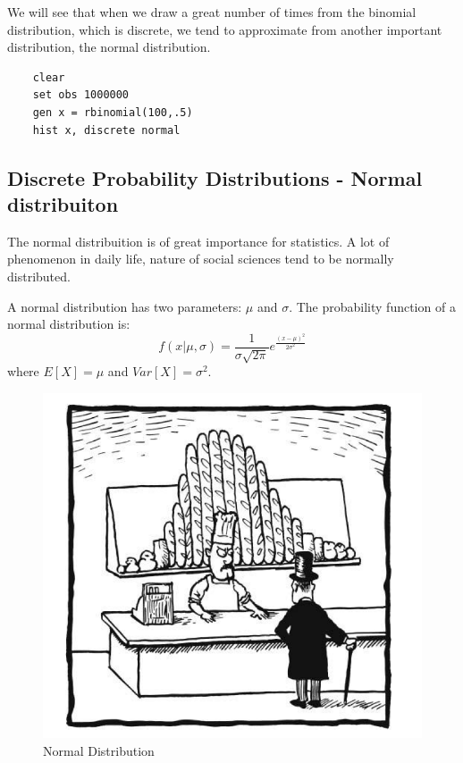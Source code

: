 \documentclass[11pt]{article}
\begin{document}
We will see that when we draw a great number of times from the binomial distribution, which is discrete, we tend to approximate from another important distribution, the normal distribution.

	\begin{verbatim}
	clear
	set obs 1000000
	gen x = rbinomial(100,.5)
	hist x, discrete normal
	\end{verbatim}

	\subsection*{Discrete Probability Distributions - Normal distribuiton}

The normal distribuition is of great importance for statistics. A lot of phenomenon in daily life, nature of social sciences tend to be normally distributed.


A normal distribution has two parameters: $\mu$ and $\sigma$. The probability function of a normal distribution is:
\[f(x|\mu,\sigma)=\frac{1}{\sigma \sqrt{2\pi}}e^{\frac{(x-\mu)^2}{2\sigma^2}}\]
where $E[X]=\mu$ and $Var[X]=\sigma^2$.

\begin{figure}[htp]
\centering
\includegraphics[scale=0.4]{pao.png}
\caption{Normal Distribution}
\label{}
\end{figure}
\end{document}
